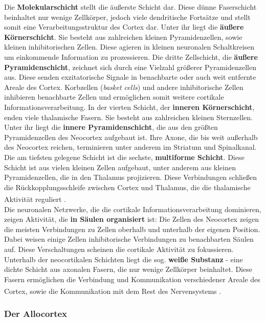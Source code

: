 \documentclass[12pt,a4paper,pdftex]{article}
\begin{document}
\noindent Die \textbf{Molekularschicht} stellt die äußerste Schicht dar. Diese dünne Faserschicht beinhaltet nur wenige Zellkörper, jedoch viele dendritische Fortsätze und stellt somit eine Verarbeitungsstruktur des Cortex dar. Unter ihr liegt die \textbf{äußere Körnerschicht}. Sie besteht aus zahlreichen kleinen Pyramidenzellen, sowie kleinen inhibitorischen Zellen. Diese agieren in kleinen neuronalen Schaltkreisen um einkommende Information zu prozessieren. Die dritte Zellschicht, die \textbf{äußere Pyramidenschicht}, zeichnet sich durch eine Vielzahl größerer Pyramidenzellen aus. Diese senden exzitatorische Signale in benachbarte oder auch weit entfernte Areale des Cortex. Korbzellen (\textit{basket cells})  und andere inhibitorische Zellen inhibieren benachbarte Zellen und ermöglichen somit weitere cortikale Informationsverarbeitung. In der vierten Schicht, der \textbf{inneren Körnerschicht}, enden viele thalamische Fasern. Sie besteht aus zahlreichen kleinen Sternzellen. Unter ihr liegt die \textbf{innere Pyramidenschicht}, die aus den größten Pyramidenzellen des Neocortex aufgebaut ist. Ihre Axone, die bis weit außerhalb des Neocortex reichen, terminieren unter anderem im Striatum und Spinalkanal. Die am tiefsten gelegene Schicht ist die sechste, \textbf{multiforme Schicht}. Diese Schicht ist aus vielen kleinen Zellen aufgebaut, unter anderem aus kleinen Pyramidenzellen, die in den Thalamus projizieren. Diese Verbindungen schließen die Rückkopplungsschleife zwischen Cortex und Thalamus, die die thalamische Aktivität reguliert \textsuperscript{\cite[7]{watson2010thebrain}}.\\
Die neuronalen Netzwerke, die die cortikale Informationsverarbeitung dominieren, zeigen Aktivität, die \textbf{in Säulen organisiert} ist: Die Zellen des Neocortex zeigen die meisten Verbindungen zu Zellen oberhalb und unterhalb der eigenen Position. Dabei weisen einige Zellen inhibitorische Verbindungen zu benachbarten Säulen auf. Diese Verschaltungen scheinen die cortikale Aktivität zu fokussieren.\\
\noindent Unterhalb der neocortikalen Schichten liegt die sog. \textbf{weiße Substanz} - eine dichte Schicht aus axonalen Fasern, die nur wenige Zellkörper beinhaltet. Diese Fasern ermöglichen die Verbindung und Kommunikation verschiedener Areale des Cortex, sowie die Kommunikation mit dem Rest des Nervensystems \textsuperscript{\cite[7]{watson2010thebrain}}.

\subsubsection*{Der Allocortex} 
\end{document}
